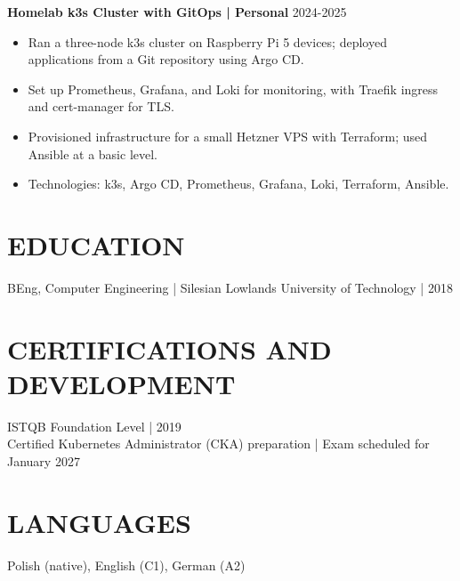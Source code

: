 \documentclass[11pt,a4paper]{article}
\begin{document}
\textbf{Homelab k3s Cluster with GitOps | Personal} \hfill 2024-2025
\begin{itemize}
\item Ran a three-node k3s cluster on Raspberry Pi 5 devices; deployed applications from a Git repository using Argo CD.
\item Set up Prometheus, Grafana, and Loki for monitoring, with Traefik ingress and cert-manager for TLS.
\item Provisioned infrastructure for a small Hetzner VPS with Terraform; used Ansible at a basic level.
\item Technologies: k3s, Argo CD, Prometheus, Grafana, Loki, Terraform, Ansible.
\end{itemize}

\section*{EDUCATION}
BEng, Computer Engineering | Silesian Lowlands University of Technology | 2018

\section*{CERTIFICATIONS AND DEVELOPMENT}
ISTQB Foundation Level | 2019\\
Certified Kubernetes Administrator (CKA) preparation | Exam scheduled for January 2027

\section*{LANGUAGES}
Polish (native), English (C1), German (A2)
\end{document}
